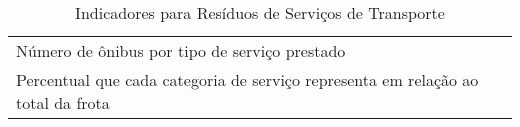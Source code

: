 \begin{table}[h!]
  \centering
  \caption{Indicadores para Resíduos de Serviços de Transporte}
    \begin{tabular}{|p{22.43em}|}
    \rowcolor[rgb]{ .984,  .831,  .706} \multicolumn{1}{p{22.43em}}{RESÍDUOS DE SERVIÇOS DE TRANSPORTE} \\
    \midrule
    Número de ônibus por tipo de serviço prestado \\
    \midrule
    Percentual que cada categoria de serviço representa em relação ao total da frota \\
    \bottomrule
    \end{tabular}%
  \label{tab:ind_rst}%
\end{table}%
